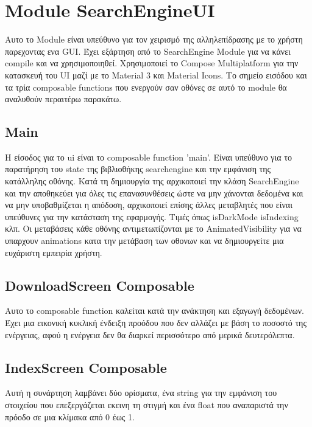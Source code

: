 \documentclass[conference]{IEEEtran}
\begin{document}
    \section{Module SearchEngineUI}{
        Αυτο το Module είναι υπεύθυνο για τον χειρισμό της αλληλεπίδρασης με το χρήστη παρεχοντας ενα GUI.
        Έχει εξάρτηση από το SearchEngine Module για να κάνει compile και να χρησιμοποιηθεί.
        Χρησιμοποιεί το Compose Multiplatform για την κατασκευή του UI μαζί με το Material 3 και Material Icons.
        Το σημείο εισόδου και τα τρία composable functions που ενεργούν σαν οθόνες σε αυτό το module θα αναλυθούν περαιτέρω παρακάτω.

        \subsection{Main}{Η είσοδος για το ui είναι το composable function 'main'.
        Είναι υπεύθυνο για το παρατήρηση του state της βιβλιοθήκης searchengine και την εμφάνιση της κατάλληλης οθόνης.
        Κατά τη δημιουργία της αρχικοποιεί την κλάση SearchEngine και την αποθηκεύει για όλες τις επανασυνθέσεις ώστε να μην χάνονται δεδομένα και να μην υποβαθμίζεται η απόδοση,
            αρχικοποιεί επίσης άλλες μεταβλητές που είναι υπεύθυνες για την κατάσταση της εφαρμογής. Τιμές όπως isDarkMode isIndexing κλπ.
            Οι μεταβάσεις κάθε οθόνης αντιμετωπίζονται με το AnimatedVisibility για να υπαρχουν animations κατα την μετάβαση των οθονων και να δημιουργείτε μια ευχάριστη εμπειρία χρήστη.
        }\label{main}

        \subsection{DownloadScreen Composable}{Αυτο το composable function καλείται κατά την ανάκτηση και εξαγωγή δεδομένων.
        Έχει μια εικονική κυκλική ένδειξη προόδου που δεν αλλάζει με βάση το ποσοστό της ενέργειας, αφού η ενέργεια δεν θα διαρκεί περισσότερο από μερικά δευτερόλεπτα.
        }\label{download-screen}

        \subsection{IndexScreen Composable}{Αυτή η συνάρτηση λαμβάνει δύο ορίσματα, ένα string για την εμφάνιση του στοιχείου που επεξεργάζεται εκεινη τη στιγμή και ένα float που αναπαριστά την πρόοδο σε μια κλίμακα από 0 έως 1.}\label{index-screen}

}
\end{document}
